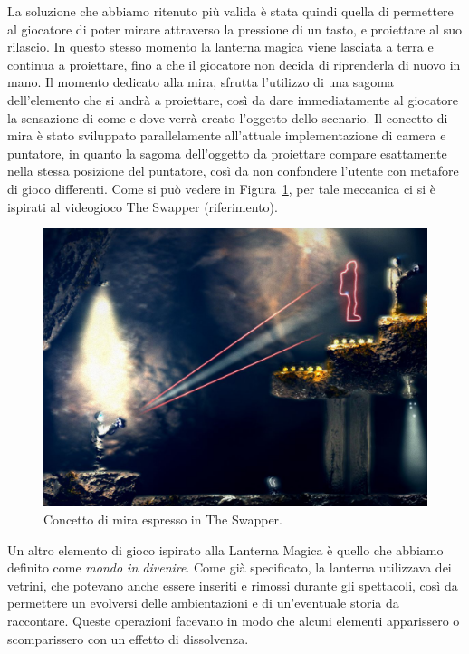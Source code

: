 La soluzione che abbiamo ritenuto più valida è stata quindi quella di permettere al giocatore di poter mirare attraverso la pressione di un tasto, e proiettare al suo rilascio. In questo stesso momento la lanterna magica viene lasciata a terra e continua a proiettare, fino a che il giocatore non decida di riprenderla di nuovo in mano.
Il momento dedicato alla mira, sfrutta l’utilizzo di una sagoma dell’elemento che si andrà a proiettare, così da dare immediatamente al giocatore la sensazione di come e dove verrà creato l’oggetto dello scenario.
Il concetto di mira è stato sviluppato parallelamente all’attuale implementazione di camera e puntatore, in quanto la sagoma dell’oggetto da proiettare compare esattamente nella stessa posizione del puntatore, così da non confondere l’utente con metafore di gioco differenti.
Come si può vedere in Figura~\ref{fig:meccaniche_precinema_swapper}, per tale meccanica ci si è ispirati al videogioco The Swapper (riferimento).

\begin{figure}%
	\centering
	\includegraphics[width= 0.85\columnwidth]{images/gameDesign/21_swapper.jpg}
	\caption{Concetto di mira espresso in The Swapper.}
	\label{fig:meccaniche_precinema_swapper}
\end{figure} 

Un altro elemento di gioco ispirato alla Lanterna Magica è quello che abbiamo definito come \textit{mondo in divenire}.
Come già specificato, la lanterna utilizzava dei vetrini, che potevano anche essere inseriti e rimossi durante gli spettacoli, così da permettere un evolversi delle ambientazioni e di un’eventuale storia da raccontare. Queste operazioni facevano in modo che alcuni elementi apparissero o scomparissero con un effetto di dissolvenza.

